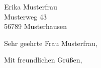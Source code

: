 \documentclass{scrlttr2}
\begin{document}
  \begin{letter}{%
      Erika Musterfrau\\
      Musterweg 43\\
      56789 Musterhausen%
    }
    \opening{Sehr geehrte Frau Musterfrau,}
    \Blindtext 
    \closing{Mit freundlichen Grüßen,}
  \end{letter}
\end{document}
